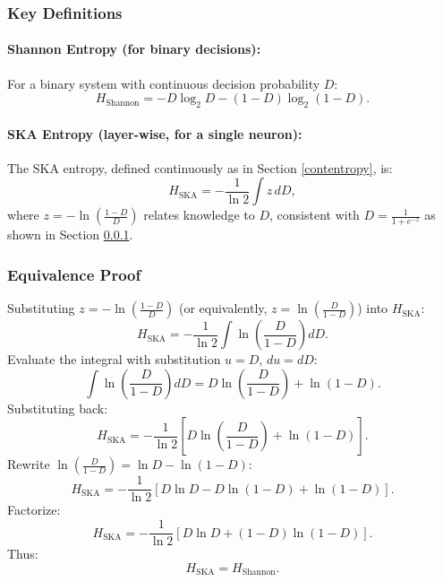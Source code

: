 \documentclass{article}
\begin{document}
\subsubsection{Key Definitions}\label{keydef}

\paragraph{Shannon Entropy (for binary decisions):}
For a binary system with continuous decision probability \( D \):
\begin{equation}
	H_{\text{Shannon}} = -D \log_2 D - (1-D) \log_2 (1-D).
\end{equation}

\paragraph{SKA Entropy (layer-wise, for a single neuron):}
The SKA entropy, defined continuously as in Section \ref{contentropy}, is:
\begin{equation}
	H_{\text{SKA}} = -\frac{1}{\ln 2} \int z \, dD,
\end{equation}
where \( z = -\ln\left(\frac{1-D}{D}\right) \) relates knowledge to \( D \), consistent with \( D = \frac{1}{1 + e^{-z}} \) as shown in Section \ref{keydef}.

\subsubsection{Equivalence Proof}

Substituting \( z = -\ln\left(\frac{1-D}{D}\right) \) (or equivalently, \( z = \ln\left(\frac{D}{1-D}\right) \)) into \( H_{\text{SKA}} \):
\begin{equation}
	H_{\text{SKA}} = -\frac{1}{\ln 2} \int \ln\left(\frac{D}{1-D}\right) dD.
\end{equation}
Evaluate the integral with substitution \( u = D \), \( du = dD \):
\begin{equation}
	\int \ln\left(\frac{D}{1-D}\right) dD = D \ln\left(\frac{D}{1-D}\right) + \ln(1-D).
\end{equation}
Substituting back:
\begin{equation}
	H_{\text{SKA}} = -\frac{1}{\ln 2} \left[ D \ln\left(\frac{D}{1-D}\right) + \ln(1-D) \right].
\end{equation}
Rewrite \( \ln\left(\frac{D}{1-D}\right) = \ln D - \ln(1-D) \):
\begin{equation}
	H_{\text{SKA}} = -\frac{1}{\ln 2} \left[ D \ln D - D \ln(1-D) + \ln(1-D) \right].
\end{equation}
Factorize:
\begin{equation}
	H_{\text{SKA}} = -\frac{1}{\ln 2} \left[ D \ln D + (1-D) \ln(1-D) \right].
\end{equation}
Thus:
\begin{equation}
	H_{\text{SKA}} = H_{\text{Shannon}}.
\end{equation}
\end{document}
